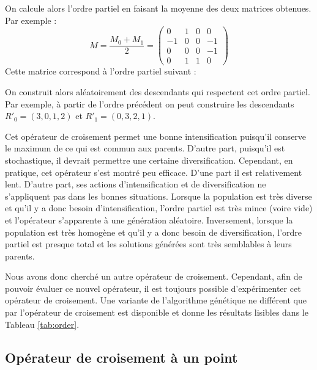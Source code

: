 \documentclass[french]{rapport}
\begin{document}
On calcule alors l'ordre partiel en faisant la moyenne des deux matrices obtenues.
Par exemple :
$$ M = \frac{M_0 + M_1}{2} = \begin{pmatrix}
   0 &  1 &  0 &  0 \\
  -1 &  0 &  0 & -1 \\
   0 &  0 &  0 & -1 \\
   0 &  1 &  1 &  0
\end{pmatrix} $$
Cette matrice correspond à l'ordre partiel suivant :
\begin{center}
\end{center}

On construit alors aléatoirement des descendants qui respectent cet ordre partiel. Par exemple, à
partir de l'ordre précédent on peut construire les descendants $R'_0 = (3,0,1,2)$ et $R'_1 =
(0,3,2,1)$.

Cet opérateur de croisement permet une bonne intensification puisqu'il conserve le maximum de ce qui
est commun aux parents. D'autre part, puisqu'il est stochastique, il devrait permettre une certaine
diversification. Cependant, en pratique, cet opérateur s'est montré peu efficace. D'une part il est
relativement lent. D'autre part, ses actions d'intensification et de diversification ne s'appliquent
pas dans les bonnes situations. Lorsque la population est très diverse et qu'il y a donc besoin
d'intensification, l'ordre partiel est très mince (voire vide) et l'opérateur s'apparente à une
génération aléatoire. Inversement, lorsque la population est très homogène et qu'il y a donc besoin
de diversification, l'ordre partiel est presque total et les solutions générées sont très semblables
à leurs parents.

Nous avons donc cherché un autre opérateur de croisement. Cependant, afin de pouvoir évaluer ce
nouvel opérateur, il est toujours possible d'expérimenter cet opérateur de croisement. Une variante
de l'algorithme génétique ne différent que par l'opérateur de croisement est disponible et donne les
résultats lisibles dans le Tableau \ref{tab:order}.


\subsection{Opérateur de croisement à un point}
\end{document}
